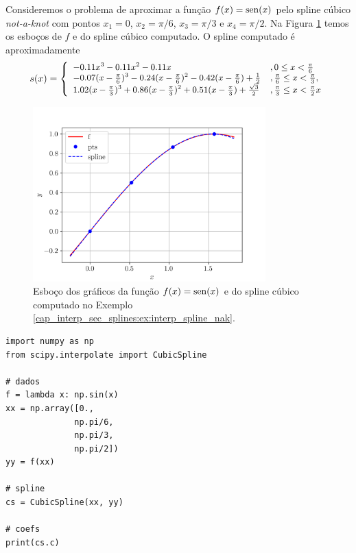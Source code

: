 \begin{ex}\label{cap_interp_sec_splines:ex:interp_spline_nak}
  Consideremos o problema de aproximar a função $f(x)=\operatorname{sen}(x)$ pelo spline cúbico {\it not-a-knot} com pontos $x_1=0$, $x_2=\pi/6$, $x_3=\pi/3$ e $x_4=\pi/2$. Na Figura \ref{cap_interp_sec_splines:fig:interp_spline_nak} temos os esboços de $f$ e do spline cúbico computado. O spline computado é aproximadamente
  \begin{equation}
    s(x) = \small\left\{\begin{array}{ll}
                          -0.11x^3 - 0.11x^2 - 0.11x &, 0\leq x < \frac{\pi}{6}\\
                          -0.07(x-\frac{\pi}{6})^3 - 0.24(x-\frac{\pi}{6})^2 - 0.42(x-\frac{\pi}{6}) + \frac{1}{2} &, \frac{\pi}{6} \leq x < \frac{\pi}{3},\\
                          1.02(x-\frac{\pi}{3})^3 + 0.86(x-\frac{\pi}{3})^2 + 0.51(x-\frac{\pi}{3}) + \frac{\sqrt{3}}{2} &, \frac{\pi}{3} \leq x < \frac{\pi}{2}x
                                                                                                                     
    \end{array}\right.
  \end{equation}

  \begin{figure}[H]
    \centering
    \includegraphics[width=0.8\textwidth]{./cap_interp/dados/fig_CSNotAKnot/fig}
    \caption{Esboço dos gráficos da função $f(x)=\operatorname{sen}(x)$ e do spline cúbico computado no Exemplo \ref{cap_interp_sec_splines:ex:interp_spline_nak}.}
    \label{cap_interp_sec_splines:fig:interp_spline_nak}
  \end{figure}

\begin{lstlisting}[caption=splineNotAKnot.py]
import numpy as np
from scipy.interpolate import CubicSpline

# dados
f = lambda x: np.sin(x)
xx = np.array([0.,
              np.pi/6,
              np.pi/3,
              np.pi/2])
yy = f(xx)

# spline
cs = CubicSpline(xx, yy)

# coefs
print(cs.c)
\end{lstlisting}
\end{ex}

